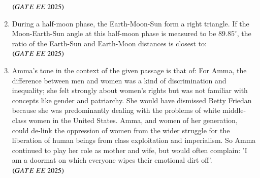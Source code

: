 \documentclass[journal,12pt,onecolumn]{IEEEtran}
\theoremstyle{remark}
\begin{document}
\begin{enumerate}
\hfill $\brak{GATE\ EE\ 2025}$
    \begin{enumerate}
    \end{enumerate}

   \item During a half-moon phase, the Earth-Moon-Sun form a right triangle. If the Moon-Earth-Sun angle at this half-moon phase is measured to be $89.85^\circ$, the ratio of the Earth-Sun and Earth-Moon distances is closest to: \\    
\hfill $\brak{GATE\ EE\ 2025}$
    \begin{enumerate}
    \end{enumerate}

 \item Amma's tone in the context of the given passage is that of: \newline
  For Amma, the difference between men and women was a kind of discrimination and inequality; she felt strongly about women's rights but was not familiar with concepts like gender and patriarchy. She would have dismissed Betty Friedan because she was predominantly dealing with the problems of white middle-class women in the United States. Amma, and women of her generation, could de-link the oppression of women from the wider struggle for the liberation of human beings from class exploitation and imperialism. So Amma continued to play her role as mother and wife, but would often complain: 'I am a doormat on which everyone wipes their emotional dirt off'.
\hfill $\brak{GATE\ EE\ 2025}$ 
    \begin{enumerate}
    \end{enumerate}


\end{enumerate}
\end{document}
